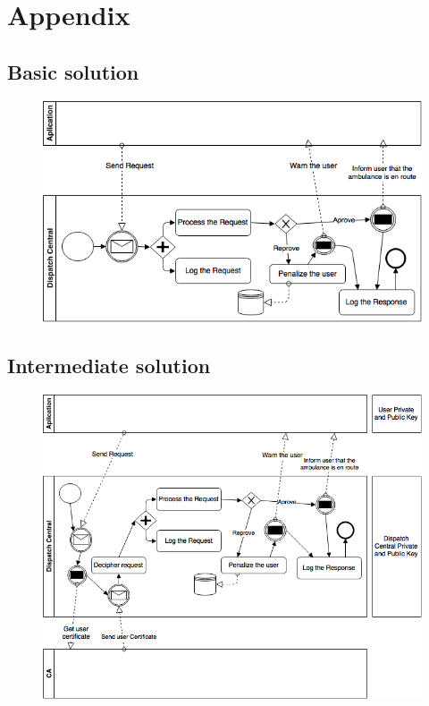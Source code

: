 \documentclass[a4paper,titlepage,11pt]{article}
\begin{document}
\section{Appendix}
\subsection{Basic solution}
\begin{figure}[h]
    \centering
    \includegraphics[scale=0.60]{img/basic-solution.png}
\end{figure}

\subsection{Intermediate solution}
\begin{figure}[h]
    \centering
    \includegraphics[scale=0.45]{img/intermediate-solution.png}
\end{figure}
\end{document}
